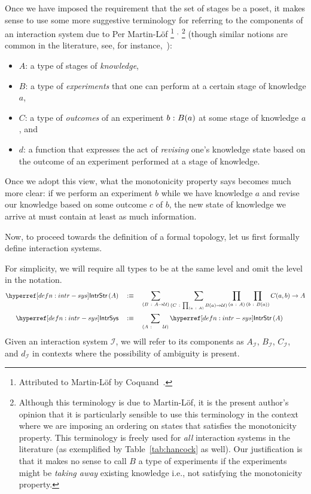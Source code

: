 Once we have imposed the requirement that the set of stages be a poset, it makes sense to
use some more suggestive terminology for referring to the components of an interaction
system due to Per Martin-Löf%
\footnote{%
  Attributed to Martin-Löf by Coquand~\cite[pg.~2]{coq-posets}.
}%
$^{,}$%
\footnote{%
  Although this terminology is due to Martin-Löf, it is the present author's opinion that
  it is particularly sensible to use this terminology in the context where we are imposing
  an ordering on states that satisfies the monotonicity property. This terminology is
  freely used for \emph{all} interaction systems in the literature (as exemplified by
  Table~\ref{tab:hancock} as well). Our justification is that it makes no sense to call
  $B$ a type of experiments if the experiments might be \emph{taking away} existing
  knowledge i.e., not satisfying the monotonicity property.
}
(though similar notions are common in the literature, see, for
instance,~\cite{philosophically-plausible}):
\begin{itemize}
  \item $A$: a type of stages of \emph{knowledge},
  \item $B$: a type of \emph{experiments} that one can perform at a certain stage of
    knowledge $a$,
  \item $C$: a type of \emph{outcomes} of an experiment $b\hspace{0.1mm}:\hspace{0.1mm}B(a)$ at some stage of
    knowledge $a$, and
  \item $d$: a function that expresses the act of \emph{revising} one's knowledge state
    based on the outcome of an experiment performed at a stage of knowledge.
\end{itemize}

Once we adopt this view, what the monotonicity property says becomes much more clear: if
we perform an experiment $b$ while we have knowledge $a$ and revise our knowledge based on
some outcome $c$ of $b$, the new state of knowledge we arrive at must contain at least as
much information.

Now, to proceed towards the definition of a formal topology, let us first formally define
interaction systems.
\begin{defn}\label{defn:intr-sys}
  For simplicity, we will require all types to be at the same level and omit the level
  in the notation.
  \begin{align*}
    \treestr{A} &\quad\is\quad
      \sigmaty{B}{A \rightarrow \univ}{
        \sigmaty{C}{\pity{a}{A}{B(a) \rightarrow \univ{}}}{
          \pity{a}{A}{\pity{b}{B(a)}{C(a, b) \rightarrow A}}
        }
      }\\
    \intrsys{} &\quad\is\quad \sigmaty{A}{~~~~\univ}{\treestr{A}}
  \end{align*}
  Given an interaction system $\mathcal{I}$, we will refer to its components as
  $A_{\mathcal{I}}$, $B_{\mathcal{I}}$, $C_{\mathcal{I}}$, and $d_{\mathcal{I}}$ in
  contexts where the possibility of ambiguity is present.
\end{defn}

